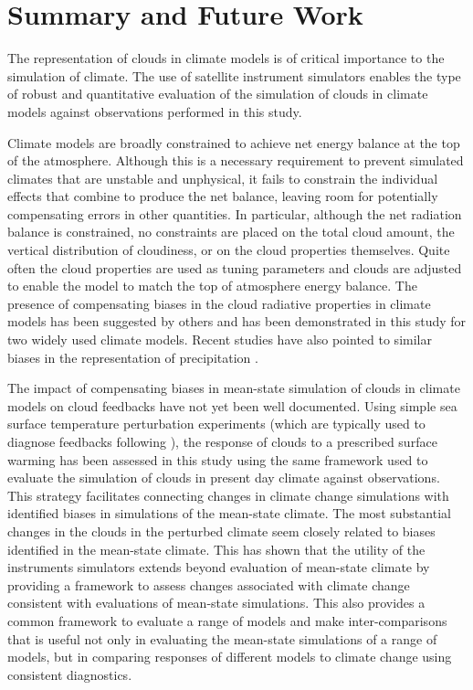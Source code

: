 \chapter{Summary and Future Work}
The representation of clouds in climate models is of critical importance to the simulation of climate. The use of satellite instrument simulators enables the type of robust and quantitative evaluation of the simulation of clouds in climate models against observations performed in this study.

Climate models are broadly constrained to achieve net energy balance at the top of the atmosphere. Although this is a necessary requirement to prevent simulated climates that are unstable and unphysical, it fails to constrain the individual effects that combine to produce the net balance, leaving room for potentially compensating errors in other quantities. In particular, although the net radiation balance is constrained, no constraints are placed on the total cloud amount, the vertical distribution of cloudiness, or on the cloud properties themselves. Quite often the cloud properties are used as tuning parameters and clouds are adjusted to enable the model to match the top of atmosphere energy balance. The presence of compensating biases in the cloud radiative properties in climate models has been suggested by others \citep[e.g.,][]{webb_et_al_2001,kay_et_al_2011} and has been demonstrated in this study for two widely used climate models. Recent studies have also pointed to similar biases in the representation of precipitation \citep{stephens_et_al_2010}.

The impact of compensating biases in mean-state simulation of clouds in climate models on cloud feedbacks have not yet been well documented. Using simple sea surface temperature perturbation experiments (which are typically used to diagnose feedbacks following \cite{cess_and_potter_1988}), the response of clouds to a prescribed surface warming has been assessed in this study using the same framework used to evaluate the simulation of clouds in present day climate against observations. This strategy facilitates connecting changes in climate change simulations with identified biases in simulations of the mean-state climate. The most substantial changes in the clouds in the perturbed climate seem closely related to biases identified in the mean-state climate. This has shown that the utility of the instruments simulators extends beyond evaluation of mean-state climate by providing a framework to assess changes associated with climate change consistent with evaluations of mean-state simulations. This also provides a common framework to evaluate a range of models and make inter-comparisons that is useful not only in evaluating the mean-state simulations of a range of models, but in comparing responses of different models to climate change using consistent diagnostics.

